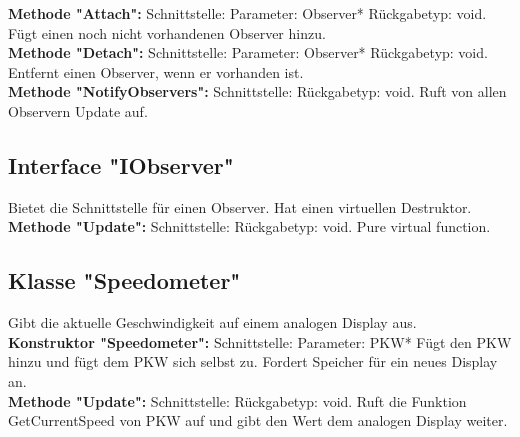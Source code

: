 \documentclass[12pt,a4paper]{article}
\begin{document}
\textbf {Methode "Attach": } 
\newline
Schnittstelle: 
\newline
Parameter: Observer*
\newline
Rückgabetyp: void.
\newline
Fügt einen noch nicht vorhandenen Observer hinzu.
\\

\textbf {Methode "Detach": } 
\newline
Schnittstelle:
\newline
Parameter: Observer*
\newline
Rückgabetyp: void.
\newline
Entfernt einen Observer, wenn er vorhanden ist.
\\

\textbf {Methode "NotifyObservers": } 
\newline
Schnittstelle:
\newline
Rückgabetyp: void.
\newline
Ruft von allen Observern Update auf.
\\


\subsection {Interface "IObserver"}
Bietet die Schnittstelle für einen Observer. Hat einen virtuellen Destruktor.
\\

\textbf {Methode "Update": } 
\newline
Schnittstelle: 
\newline
Rückgabetyp: void.
\newline
Pure virtual function.
\\

\subsection {Klasse "Speedometer"}
Gibt die aktuelle Geschwindigkeit auf einem analogen Display aus.
\\

\textbf {Konstruktor "Speedometer": } 
\newline
Schnittstelle: 
\newline
Parameter: PKW*
\newline
Fügt den PKW hinzu und fügt dem PKW sich selbst zu. Fordert Speicher für ein neues Display an.
\\

\textbf {Methode "Update": } 
\newline
Schnittstelle: 
\newline
Rückgabetyp: void.
\newline
Ruft die Funktion GetCurrentSpeed von PKW auf und gibt den Wert dem analogen Display weiter.
\\
\end{document}
